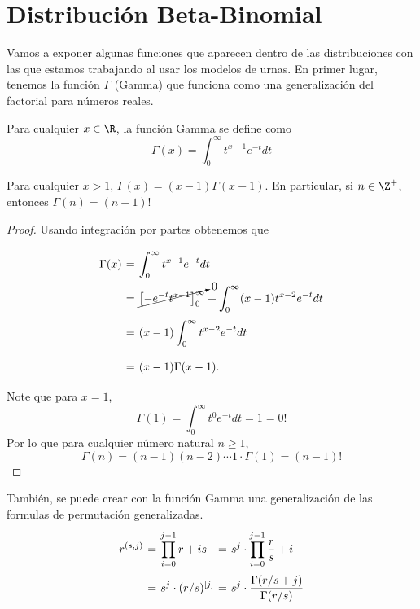 \section{Distribución Beta-Binomial}

Vamos a exponer algunas funciones que aparecen dentro de las distribuciones con las que estamos trabajando al usar los modelos de urnas. En primer lugar, tenemos la función $\Gamma$ (Gamma) que funciona como una generalización del factorial para números reales.

\begin{definition} Para cualquier $x\in \R$, la función Gamma se define como
    \[ \Gamma(x) = \int_{0}^{\infty} t^{x-1} e^{-t} dt  \]
\end{definition}

\begin{theorem}
    Para cualquier $x > 1$, $\Gamma(x) = (x-1)\Gamma(x-1)$. En particular, si $n \in\Z^+$, entonces $\Gamma(n) = (n-1)!$
\end{theorem}

\begin{proof}
    Usando integración por partes obtenemos que
    \[ \everymath{\displaystyle}
    \arraycolsep=1.8pt\def\arraystretch{2.5}
    \begin{array}{rcl}
        \Gamma(x) & = & \int_{0}^{\infty} t^{x-1} e^{-t} dt\\  
        & = & \cancelto{0}{\left[ -e^{-t} t^{x-1} \right]_0^{\infty}}  + \int_{0}^{\infty} (x-1)t^{x-2}e^{-t} dt\\
        & = & (x-1) \int_{0}^{\infty} t^{x-2}e^{-t} dt\\
        & = & (x-1)\Gamma(x-1).
    \end{array} \]
    Note que para $x = 1$,
    \[ \Gamma(1) = \int_{0}^{\infty} t^{0} e^{-t} dt = 1 = 0! \]
    Por lo que para cualquier número natural $n \geq 1$,
    \[ \Gamma(n) = (n-1)(n-2)\cdots 1 \cdot \Gamma(1) = (n-1)! \]
\end{proof}

\begin{remark} También, se puede crear con la función Gamma una generalización de las formulas de permutación generalizadas.
    \[ \everymath{\displaystyle}
    \arraycolsep=1.8pt\def\arraystretch{2.5}
    \begin{array}{rclcl}
        r^{(s,j)} & = & \prod_{i=0}^{j-1} r+is
        & = & s^j \cdot \prod_{i=0}^{j-1} \frac{r}{s}+i\\
        & = & s^j \cdot (r/s)^{[j]}
        & = & s^j \cdot \frac{\Gamma(r/s+j)}{\Gamma(r/s)}
    \end{array}  \]
\end{remark}


